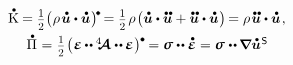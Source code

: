 \vspace{.3em}

\nopagebreak\begin{equation*}
\begin{array}{c}
\mathdotabove{\kineticenergydensity} = \smalldisplaystyleonehalf \bigl( \hspace{.1ex} \rho \hspace{.2ex} \mathdotabove{\bm{u}} \dotp \mathdotabove{\bm{u}} \hspace{.1ex} \bigr)^{\hspace{-0.2ex}\tikz[baseline=-0.2ex] \draw[black, fill=black] (0,0) circle (.28ex);} \hspace{-0.2ex}
= \smalldisplaystyleonehalf \hspace{.2ex} \rho \hspace{.2ex} \bigl( \mathdotabove{\bm{u}} \dotp \mathdotdotabove{\bm{u}} + \mathdotdotabove{\bm{u}} \dotp \mathdotabove{\bm{u}} \hspace{.1ex} \bigr)
\hspace{-0.22ex} =
\rho \hspace{.2ex} \mathdotdotabove{\bm{u}} \dotp \mathdotabove{\bm{u}}
\hspace{.2ex} ,
\\[.5em]
%
\mathdotabove{\potentialenergydensity} \hspace{.1ex} = \hspace{.1ex} \smash{\smalldisplaystyleonehalf} \hspace{-0.25ex} \tikzmark{beginDerivativeOfPotentialEnergyDensity} \left( \hspace{.1ex} \infinitesimaldeformation \hspace{-0.1ex} \dotdotp \hspace{-0.1ex} \stiffnesstensor \dotdotp \hspace{-0.1ex} \infinitesimaldeformation \hspace{.1ex} \right)^{\tikz[baseline=-0.2ex] \draw[black, fill=black] (0,0) circle (.28ex);} \hspace{-1.2ex} \tikzmark{endDerivativeOfPotentialEnergyDensity} \hspace{.7ex}
= \linearstress \dotdotp \mathdotabove{\infinitesimaldeformation}
= \linearstress \hspace{.1ex} \dotdotp \hspace{-0.12ex} \boldnabla \mathdotabove{\bm{u}}^{\hspace{.1ex}\mathsf{S}} \hspace{-0.12ex}

\end{array}
\end{equation*}
